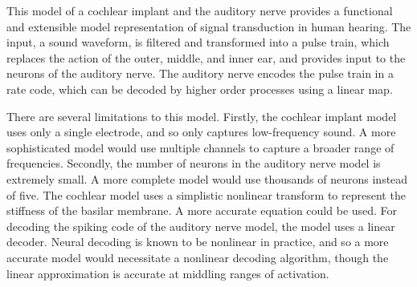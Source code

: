 \documentclass[12pt]{diazessay} %
\begin{document}
This model of a cochlear implant and the auditory nerve
provides a functional and extensible model representation of signal transduction in human hearing.
The input, a sound waveform, is filtered and transformed into a pulse train,
which replaces the action of the outer, middle, and inner ear,
and provides input to the neurons of the auditory nerve.
The auditory nerve encodes the pulse train in a rate code,
which can be decoded by higher order processes using a linear map.

There are several limitations to this model.
Firstly, the cochlear implant model uses only a single electrode,
and so only captures low-frequency sound.
A more sophisticated model would use multiple channels to capture
a broader range of frequencies.
Secondly, the number of neurons in the auditory nerve model is extremely small.
A more complete model would use thousands of neurons instead of five.
The cochlear model uses a simplistic nonlinear transform to represent the stiffness
of the basilar membrane. A more accurate equation could be used.
For decoding the spiking code of the auditory nerve model,
the model uses a linear decoder.
Neural decoding is known to be nonlinear in practice,
and so a more accurate model would necessitate a nonlinear decoding algorithm,
though the linear approximation is accurate at middling ranges of activation.





\end{document}
